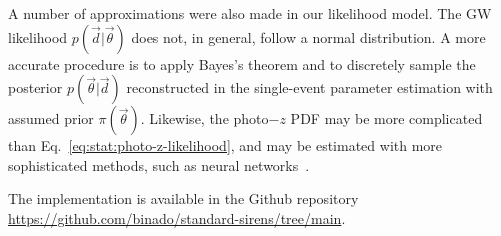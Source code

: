 \documentclass[%
preprint,
nofootinbib,
 amsmath,amssymb,
 aps,
]{revtex4-2}
\newcommand{\given}[2]{p( #1 | #2 )}
\begin{document}
A number of approximations were also made in our likelihood model. The GW likelihood
$\given{\vec{d}}{\vec{\theta}}$ does not, in general, follow a normal distribution. A more accurate
procedure is to apply Bayes's theorem and to discretely sample the posterior
$\given{\vec{\theta}}{\vec{d}}$ reconstructed in the single-event parameter estimation with assumed
prior $\pi (\vec{\theta})$. Likewise, the photo$-z$ PDF may be more complicated than
Eq.~\eqref{eq:stat:photo-z-likelihood}, and may be estimated with more sophisticated methods, such
as neural networks~\cite{Palmese_2023,alfradique2023dark}.

The implementation is available in the Github repository
\url{https://github.com/binado/standard-sirens/tree/main}.

\end{document}
